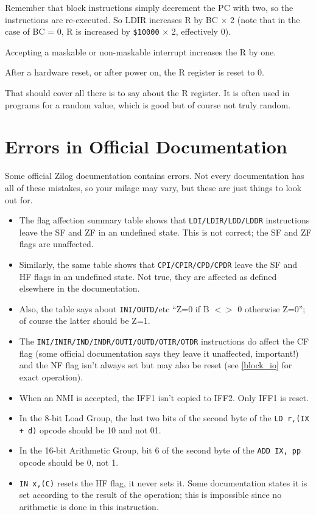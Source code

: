 \documentclass[12pt,twoside,openright,a4paper]{book}
\begin{document}
Remember that block instructions simply decrement the PC with two, so the instructions are re-executed. So LDIR increases R by BC $\times$ 2 (note that in the case of BC = 0, R is increased by {\tt \$10000} $\times$ 2, effectively 0).

Accepting a maskable or non-maskable interrupt increases the R by one.

After a hardware reset, or after power on, the R register is reset to 0.

That should cover all there is to say about the R register. It is often used in programs for a random value, which is good but of course not truly random.


\pagebreak
\section{Errors in Official Documentation}

Some official Zilog documentation contains errors. Not every documentation has all of these mistakes, so your milage may vary, but these are just things to look out for.

\begin{itemize}

	\item
	The flag affection summary table shows that {\tt LDI/LDIR/LDD/LDDR} instructions leave the SF and ZF in an undefined state. This is not correct; the SF and ZF flags are unaffected.

	\item
	Similarly, the same table shows that {\tt CPI/CPIR/CPD/CPDR} leave the SF and HF flags in an undefined state. Not true, they are affected as defined elsewhere in the documentation.

	\item
	Also, the table says about {\tt INI/OUTD/}etc ``Z=0 if B $<>$ 0 otherwise Z=0''; of course the latter should be Z=1.

	\item
	The {\tt INI/INIR/IND/INDR/OUTI/OUTD/OTIR/OTDR} instructions do affect the CF flag (some official documentation says they leave it unaffected, important!) and the NF flag isn't always set but may also be reset (see \ref{block_io} for exact operation).

	\item
	When an NMI is accepted, the IFF1 isn't copied to IFF2. Only IFF1 is reset.

	\item
	In the 8-bit Load Group, the last two bits of the second byte of the {\tt LD r,(IX + d)} opcode should be 10 and not 01.

	\item
	In the 16-bit Arithmetic Group, bit 6 of the second byte of the {\tt ADD IX, pp} opcode should be 0, not 1.

	\item
	{\tt IN x,(C)} resets the HF flag, it never sets it. Some documentation states it is set according to the result of the operation; this is impossible since no arithmetic is done in this instruction.

\end{itemize}
\end{document}
